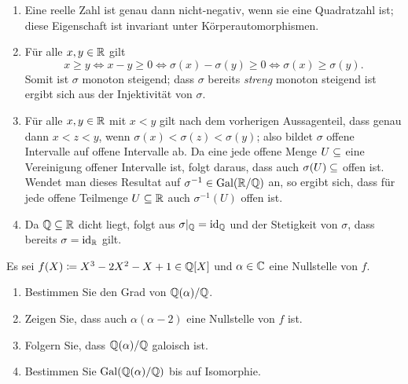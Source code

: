 \begin{solution}
  \begin{enumerate}
    \item
      Eine reelle Zahl ist genau dann nicht-negativ, wenn sie eine Quadratzahl ist;
      diese Eigenschaft ist invariant unter Körperautomorphismen.
      
    \item
      Für alle $x, y \in \mathbb{R}$ gilt
      \[
              x \geq y
        \iff  x - y \geq 0
        \iff  \sigma(x) - \sigma(y) \geq 0
        \iff  \sigma(x) \geq \sigma(y).
      \]
      Somit ist $\sigma$ monoton steigend;
      dass $\sigma$ bereits \emph{streng} monoton steigend ist ergibt sich aus der Injektivität von $\sigma$.
      
    \item
      Für alle $x, y \in \mathbb{R}$ mit $x < y$ gilt nach dem vorherigen Aussagenteil, dass genau dann $x < z < y$, wenn 
      $\sigma(x) < \sigma(z) < \sigma(y)$; also bildet $\sigma$ offene Intervalle auf offene Intervalle ab.
      Da eine jede offene Menge $U \subseteq \real$ eine Vereinigung offener Intervalle ist, folgt daraus, dass auch $\sigma(U) \subseteq \real$ offen ist.
      Wendet man dieses Resultat auf $\sigma^{-1} \in \operatorname{Gal}(\mathbb{R}/\mathbb{Q})$ an, so ergibt sich, dass für jede offene Teilmenge $U \subseteq \mathbb{R}$ auch $\sigma^{-1}(U)$ offen ist.
    
    \item
      Da $\mathbb{Q} \subseteq \mathbb{R}$ dicht liegt, folgt aus $\sigma|_{\mathbb{Q}} = \operatorname{id}_{\mathbb{Q}}$ und der Stetigkeit von $\sigma$, dass bereits $\sigma = \operatorname{id}_{\mathbb{R}}$ gilt.
  \end{enumerate}
\end{solution}


\begin{question}
  Es sei $f(X) \coloneqq X^3 - 2 X^2 - X + 1 \in \mathbb{Q}[X]$ und $\alpha \in \mathbb{C}$ eine Nullstelle von $f$.
  \begin{enumerate}
    \item
      Bestimmen Sie den Grad von $\mathbb{Q}(\alpha) / \mathbb{Q}$.
    \item
      Zeigen Sie, dass auch $\alpha(\alpha-2)$ eine Nullstelle von $f$ ist.
    \item
      Folgern Sie, dass $\mathbb{Q}(\alpha)/\mathbb{Q}$ galoisch ist.
    \item
      Bestimmen Sie $\operatorname{Gal}(\mathbb{Q}(\alpha)/\mathbb{Q})$ bis auf Isomorphie.
  \end{enumerate}
\end{question}


